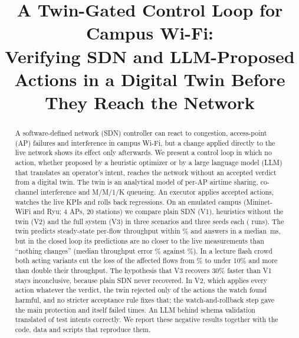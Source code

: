 \documentclass[conference]{IEEEtran}
\begin{document}
\title{A Twin-Gated Control Loop for Campus Wi-Fi:\\ Verifying SDN and LLM-Proposed Actions in a Digital Twin Before They Reach the Network}

\author{
\and
{}
}

\maketitle

\begin{abstract}
A software-defined network (SDN) controller can react to congestion, access-point (AP) failures and interference in campus Wi-Fi, but a change applied directly to the live network shows its effect only afterwards. We present a control loop in which no action, whether proposed by a heuristic optimizer or by a large language model (LLM) that translates an operator's intent, reaches the network without an accepted verdict from a digital twin. The twin is an analytical model of per-AP airtime sharing, co-channel interference and M/M/1/K queueing. An executor applies accepted actions, watches the live KPIs and rolls back regressions. On an emulated campus (Mininet-WiFi and Ryu; 4 APs, 20 stations) we compare plain SDN (V1), heuristics without the twin (V2) and the full system (V3) in three scenarios and three seeds each (\NumRuns{} runs). The twin predicts steady-state per-flow throughput within \TwinMape\% and answers in a median \SimMedianMs\,ms, but in the closed loop its predictions are no closer to the live measurements than ``nothing changes'' (median throughput error \LiveThrErr\% against \LiveThrBase\%). In a lecture flash crowd both acting variants cut the loss of the affected flows from \KpiFlashLossVone\% to under 10\% and more than double their throughput. The hypothesis that V3 recovers 30\% faster than V1 stays inconclusive, because plain SDN never recovered. In V2, which applies every action whatever the verdict, the twin rejected only \HarmRejected{} of the \HarmAll{} actions the watch found harmful, and no stricter acceptance rule fixes that; the watch-and-rollback step gave the main protection and itself failed \RbFailAll{} times. An LLM behind schema validation translated \IntCloudOk{} of \IntCases{} test intents correctly. We report these negative results together with the code, data and scripts that reproduce them.
\end{abstract}
\end{document}
